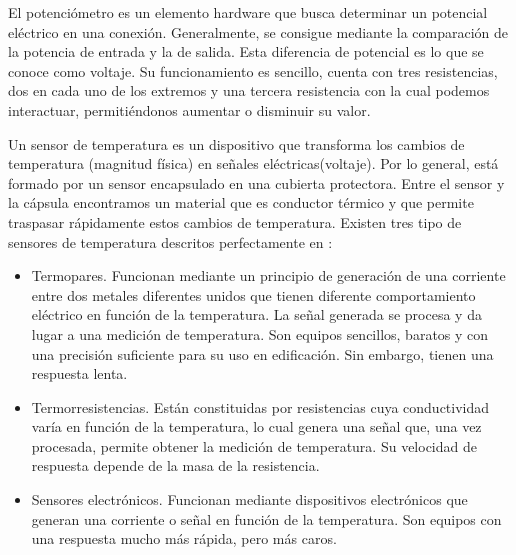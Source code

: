 El potenciómetro \cite{Potenciometro} es un elemento hardware que busca determinar un potencial eléctrico en una conexión. Generalmente, se consigue mediante la comparación de la potencia de entrada y la de salida. Esta diferencia de potencial es lo que se conoce como voltaje.
Su funcionamiento es sencillo, cuenta con tres resistencias, dos en cada uno de los extremos y una tercera resistencia con la cual podemos interactuar, permitiéndonos aumentar o disminuir su valor.

Un sensor de temperatura \cite{TempSens} es un dispositivo que transforma los cambios de temperatura (magnitud física) en señales eléctricas(voltaje). Por lo general, está  formado por un sensor encapsulado en una cubierta protectora. Entre el sensor y la cápsula encontramos un material que es  conductor térmico y que permite traspasar rápidamente estos cambios de temperatura. Existen tres tipo de sensores de temperatura descritos perfectamente en \cite{TempSensTipos}:

\begin{itemize}
\item Termopares. Funcionan mediante un principio de generación de una corriente entre dos metales diferentes unidos que tienen diferente comportamiento eléctrico en función de la temperatura. La señal generada se procesa y da lugar a una medición de temperatura. Son equipos sencillos, baratos y con una precisión suficiente para su uso en edificación. Sin embargo, tienen una respuesta lenta.
\item Termorresistencias. Están constituidas por resistencias cuya conductividad varía en función de la temperatura, lo cual genera una señal que, una vez procesada, permite obtener la medición de temperatura. Su velocidad de respuesta depende de la masa de la resistencia.
\item Sensores electrónicos. Funcionan mediante dispositivos electrónicos que generan una corriente o señal en función de la temperatura. Son equipos con una respuesta mucho más rápida, pero más caros.
\end{itemize}


